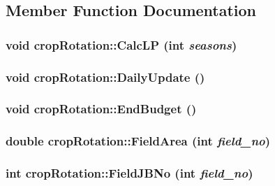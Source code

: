 \subsection{Member Function Documentation}
\hypertarget{classcrop_rotation_ae3c3bc02c3b5c919ff640390297094f4}{
\subsubsection[{CalcLP}]{\setlength{\rightskip}{0pt plus 5cm}void cropRotation::CalcLP (int {\em seasons})}}
\label{classcrop_rotation_ae3c3bc02c3b5c919ff640390297094f4}
\hypertarget{classcrop_rotation_ab7b6db261a0972935ec1b84205495421}{
\subsubsection[{DailyUpdate}]{\setlength{\rightskip}{0pt plus 5cm}void cropRotation::DailyUpdate ()}}
\label{classcrop_rotation_ab7b6db261a0972935ec1b84205495421}
\hypertarget{classcrop_rotation_a8e10518d55c693afca303214eb909f8a}{
\subsubsection[{EndBudget}]{\setlength{\rightskip}{0pt plus 5cm}void cropRotation::EndBudget ()}}
\label{classcrop_rotation_a8e10518d55c693afca303214eb909f8a}
\hypertarget{classcrop_rotation_a8e06fe96e9ec89ad59170385960e026f}{
\subsubsection[{FieldArea}]{\setlength{\rightskip}{0pt plus 5cm}double cropRotation::FieldArea (int {\em field\_\-no})}}
\label{classcrop_rotation_a8e06fe96e9ec89ad59170385960e026f}
\hypertarget{classcrop_rotation_ae99cf520b3808fbcd2265743a8273e0e}{
\subsubsection[{FieldJBNo}]{\setlength{\rightskip}{0pt plus 5cm}int cropRotation::FieldJBNo (int {\em field\_\-no})}}
